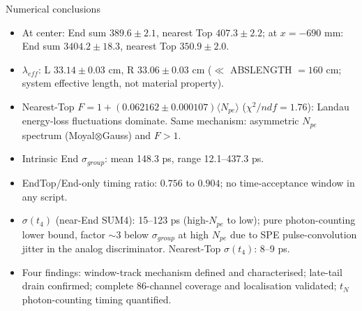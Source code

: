 \documentclass[aspectratio=169]{beamer}
\begin{document}
\begin{frame}{Numerical conclusions}

\small\begin{itemize}
 \item At center: End sum $389.6\pm2.1$, nearest Top $407.3\pm2.2$;
       at $x=-690$ mm: End sum $3404.2\pm18.3$, nearest Top $350.9\pm2.0$.
 \item $\lambda_{eff}$: L $33.14\pm0.03$ cm,
       R $33.06\pm0.03$ cm
       ($\ll$ ABSLENGTH $=160$ cm; system effective length, not material property).
 \item Nearest-Top $F=1+(0.062162\pm0.000107)\langle N_{pe}\rangle$
       ($\chi^2/ndf=1.76$): Landau energy-loss fluctuations dominate.
       Same mechanism: asymmetric $N_{pe}$ spectrum (Moyal$\otimes$Gauss) and $F>1$.
 \item Intrinsic End $\sigma_{group}$: mean 148.3 ps,
       range 12.1--437.3 ps.
 \item EndTop/End-only timing ratio: $0.756$
       to $0.904$; no time-acceptance window in any script.
 \item $\sigma(t_4)$ (near-End SUM4): 15--123 ps (high-$N_{pe}$ to low); pure photon-counting lower bound, factor $\sim3$ below $\sigma_{group}$ at high $N_{pe}$ due to SPE pulse-convolution jitter in the analog discriminator. Nearest-Top $\sigma(t_4)$: 8--9 ps.
 \item Four findings: window-track mechanism defined and characterised; late-tail drain confirmed;
       complete 86-channel coverage and localisation validated; $t_N$ photon-counting timing quantified.
\end{itemize}

\end{frame}
\end{document}
